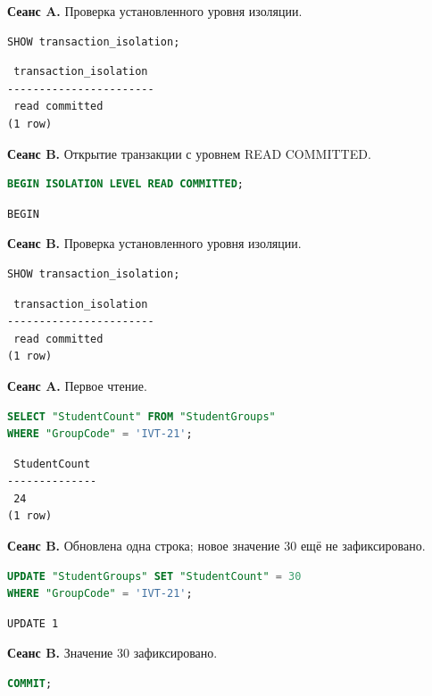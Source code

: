 \documentclass[12pt,a4paper]{article}
\begin{document}
\textbf{Сеанс A.} Проверка установленного уровня изоляции.
\begin{lstlisting}[language=SQL]
SHOW transaction_isolation;
\end{lstlisting}

\begin{lstlisting}
 transaction_isolation
-----------------------
 read committed
(1 row)
\end{lstlisting}

\textbf{Сеанс B.} Открытие транзакции с уровнем READ COMMITTED.
\begin{lstlisting}[language=SQL]
BEGIN ISOLATION LEVEL READ COMMITTED;
\end{lstlisting}

\begin{lstlisting}
BEGIN
\end{lstlisting}

\textbf{Сеанс B.} Проверка установленного уровня изоляции.
\begin{lstlisting}[language=SQL]
SHOW transaction_isolation;
\end{lstlisting}

\begin{lstlisting}
 transaction_isolation
-----------------------
 read committed
(1 row)
\end{lstlisting}

\textbf{Сеанс A.} Первое чтение.
\begin{lstlisting}[language=SQL]
SELECT "StudentCount" FROM "StudentGroups"
WHERE "GroupCode" = 'IVT-21';
\end{lstlisting}

\begin{lstlisting}
 StudentCount
--------------
 24
(1 row)
\end{lstlisting}

\textbf{Сеанс B.} Обновлена одна строка; новое значение 30 ещё не зафиксировано.
\begin{lstlisting}[language=SQL]
UPDATE "StudentGroups" SET "StudentCount" = 30
WHERE "GroupCode" = 'IVT-21';
\end{lstlisting}

\begin{lstlisting}
UPDATE 1
\end{lstlisting}

\textbf{Сеанс B.} Значение 30 зафиксировано.
\begin{lstlisting}[language=SQL]
COMMIT;
\end{lstlisting}
\end{document}

